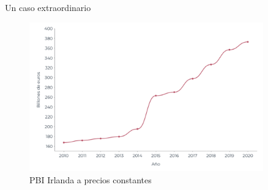 \documentclass{beamer}
\begin{document}
\begin{frame}{Un caso extraordinario }
    
\begin{figure} [H]
\centering
\includegraphics[width=0.9\textwidth]{Slides Principios de Economia/Figures/29.4.pdf}
\caption{PBI Irlanda a precios constantes}
\label{fig:G1}
\end{figure} 
\end{frame}

\end{document}
